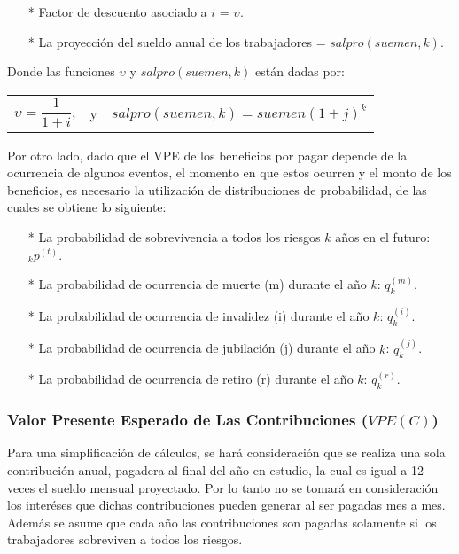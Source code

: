 \documentclass[12pt,letterpaper,titlepage]{article}
\begin{document}
\begin{itemize}
	\item [*] Factor de descuento asociado a $i$ = $\upsilon$.
	\item [*] La proyección del sueldo anual de los trabajadores = $salpro(suemen,k)$.
\end{itemize}

Donde las funciones  $\upsilon$ y $salpro(suemen,k)$ están dadas por:

\begin{center}
	\begin{tabular}{ccc}
		$\upsilon = \dfrac{1}{1+i}$, & y & $salpro(suemen,k)=suemen(1+j)^{k}$
	\end{tabular} 
\end{center}

Por otro lado, dado que el VPE de los beneficios por pagar depende de la ocurrencia de algunos eventos, el momento en que estos ocurren y el monto de los beneficios, es necesario la utilización de distribuciones de probabilidad, de las cuales se obtiene lo siguiente:

\begin{itemize}
		\item [*] La probabilidad de sobrevivencia a todos los riesgos $k$ años en el futuro: $_{k}p^{(t)}$.
		\item [*] La probabilidad de ocurrencia de muerte (m) durante el año $k$: $q_{k}^{(m)}$.
		\item [*] La probabilidad de ocurrencia de invalidez (i) durante el año $k$: $q_{k}^{(i)}$.
		\item [*] La probabilidad de ocurrencia de jubilación (j) durante el año $k$: $q_{k}^{(j)}$.
		\item [*] La probabilidad de ocurrencia de retiro (r) durante el año $k$: $q_{k}^{(r)}$.
\end{itemize}

\subsubsection{Valor Presente Esperado de Las Contribuciones ($V\!PE(C)$)}

Para una simplificación de cálculos, se hará consideración que se realiza una sola contribución anual, pagadera al final del año en estudio, la cual es igual a 12 veces el sueldo mensual proyectado. Por lo tanto no se tomará en consideración los interéses que dichas contribuciones pueden generar al ser pagadas mes a  mes. Además se asume que cada año las contribuciones son pagadas solamente si los trabajadores sobreviven a todos los riesgos.
\end{document}

